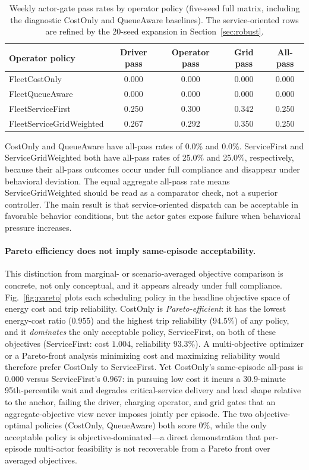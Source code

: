 \documentclass[12pt]{article}
\newcommand{\figref}[1]{Fig.~\ref{#1}}
\begin{document}
\begin{table}[t]
\centering
\caption{Weekly actor-gate pass rates by operator policy (five-seed full matrix, including the diagnostic CostOnly and QueueAware baselines). The service-oriented rows are refined by the 20-seed expansion in Section~\ref{sec:robust}.}
\label{tab:weeklymatrix}
\begin{tabular}{lcccc}
\hline
Operator policy & Driver pass & Operator pass & Grid pass & All-pass \\
\hline
FleetCostOnly & 0.000 & 0.000 & 0.000 & 0.000 \\
FleetQueueAware & 0.000 & 0.000 & 0.000 & 0.000 \\
FleetServiceFirst & 0.250 & 0.300 & 0.342 & 0.250 \\
FleetServiceGridWeighted & 0.267 & 0.292 & 0.350 & 0.250 \\
\hline
\end{tabular}
\end{table}

CostOnly and QueueAware have all-pass rates of 0.0\% and 0.0\%. ServiceFirst and ServiceGridWeighted both have all-pass rates of 25.0\% and 25.0\%, respectively, because their all-pass outcomes occur under full compliance and disappear under behavioral deviation. The equal aggregate all-pass rate means ServiceGridWeighted should be read as a comparator check, not a superior controller. The main result is that service-oriented dispatch can be acceptable in favorable behavior conditions, but the actor gates expose failure when behavioral pressure increases.

\paragraph{Pareto efficiency does not imply same-episode acceptability.} This distinction from marginal- or scenario-averaged objective comparison is concrete, not only conceptual, and it appears already under full compliance. \figref{fig:pareto} plots each scheduling policy in the headline objective space of energy cost and trip reliability. CostOnly is \emph{Pareto-efficient}: it has the lowest energy-cost ratio ($0.955$) and the highest trip reliability ($94.5\%$) of any policy, and it \emph{dominates} the only acceptable policy, ServiceFirst, on both of these objectives (ServiceFirst: cost $1.004$, reliability $93.3\%$). A multi-objective optimizer or a Pareto-front analysis minimizing cost and maximizing reliability would therefore prefer CostOnly to ServiceFirst. Yet CostOnly's same-episode all-pass is $0.000$ versus ServiceFirst's $0.967$: in pursuing low cost it incurs a $30.9$-minute 95th-percentile wait and degrades critical-service delivery and load shape relative to the anchor, failing the driver, charging operator, and grid gates that an aggregate-objective view never imposes jointly per episode. The two objective-optimal policies (CostOnly, QueueAware) both score $0\%$, while the only acceptable policy is objective-dominated---a direct demonstration that per-episode multi-actor feasibility is not recoverable from a Pareto front over averaged objectives.
\end{document}
